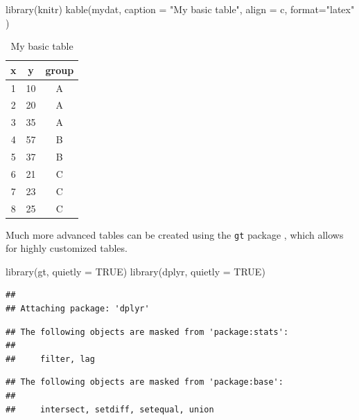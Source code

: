 \documentclass[
]{book}
\newenvironment{Shaded}{\begin{snugshade}}{\end{snugshade}}
\newcommand{\AttributeTok}[1]{\textcolor[rgb]{0.77,0.63,0.00}{#1}}
\newcommand{\ConstantTok}[1]{\textcolor[rgb]{0.00,0.00,0.00}{#1}}
\newcommand{\FunctionTok}[1]{\textcolor[rgb]{0.00,0.00,0.00}{#1}}
\newcommand{\NormalTok}[1]{#1}
\newcommand{\StringTok}[1]{\textcolor[rgb]{0.31,0.60,0.02}{#1}}
\begin{document}
\begin{Shaded}
\begin{Highlighting}[]
\FunctionTok{library}\NormalTok{(knitr)}
\FunctionTok{kable}\NormalTok{(mydat,}
      \AttributeTok{caption =} \StringTok{"My basic table"}\NormalTok{,}
      \AttributeTok{align =} \StringTok{\textquotesingle{}c\textquotesingle{}}\NormalTok{,  }
      \AttributeTok{format=}\StringTok{"latex"}\NormalTok{  )}
\end{Highlighting}
\end{Shaded}

\begin{table}

\caption{\label{tab:unnamed-chunk-46}My basic table}
\centering
\begin{tabular}[t]{c|c|c}
\hline
x & y & group\\
\hline
1 & 10 & A\\
\hline
2 & 20 & A\\
\hline
3 & 35 & A\\
\hline
4 & 57 & B\\
\hline
5 & 37 & B\\
\hline
6 & 21 & C\\
\hline
7 & 23 & C\\
\hline
8 & 25 & C\\
\hline
\end{tabular}
\end{table}

Much more advanced tables can be created using the \texttt{gt} package \citet{GT},
which allows for highly customized tables.

\begin{Shaded}
\begin{Highlighting}[]
\FunctionTok{library}\NormalTok{(gt, }
        \AttributeTok{quietly =} \ConstantTok{TRUE}\NormalTok{)}
\FunctionTok{library}\NormalTok{(dplyr,}
        \AttributeTok{quietly =} \ConstantTok{TRUE}\NormalTok{)}
\end{Highlighting}
\end{Shaded}

\begin{verbatim}
## 
## Attaching package: 'dplyr'
\end{verbatim}

\begin{verbatim}
## The following objects are masked from 'package:stats':
## 
##     filter, lag
\end{verbatim}

\begin{verbatim}
## The following objects are masked from 'package:base':
## 
##     intersect, setdiff, setequal, union
\end{verbatim}
\end{document}
